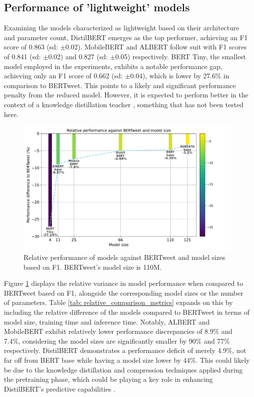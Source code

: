 \subsection{Performance of 'lightweight' models}
Examining the models characterized as lightweight based on their architecture and parameter count, DistilBERT emerges as the top performer, achieving an F1 score of 0.863 (sd: $\pm$0.02). MobileBERT and ALBERT follow suit with F1 scores of 0.841 (sd: $\pm$0.02) and 0.827 (sd: $\pm$0.05) respectively. BERT Tiny, the smallest model employed in the experiments, exhibits a notable performance gap, achieving only an F1 score of 0.662 (sd: $\pm$0.04), which is lower by 27.6\% in comparison to BERTweet. This points to a likely and significant performance penalty from the reduced model. However, it is expected to perform better in the context of a knowledge distillation teacher \cite{turcWellReadStudentsLearn2019}, something that has not been tested here.\\

\begin{figure}[htb]
    \centering
    \includegraphics[width=12cm]{figures/model_size_vs_perf.pdf}
    \vspace*{-3mm}
    \caption{Relative performance of models against BERTweet and model sizes based on F1. BERTweet's model size is 110M.}
    \label{fig: model_size_vs_perf}
\end{figure}

Figure \ref{fig: model_size_vs_perf} displays the relative variance in model performance when compared to BERTweet based on F1, alongside the corresponding model sizes or the number of parameters. Table \ref{tab: relative_comparison_metrics} expands on this by including the relative difference of the models compared to BERTweet in terms of model size, training time and inference time. Notably, ALBERT and MobileBERT exhibit relatively lower performance discrepancies of 8.9\% and 7.4\%, considering the model sizes are significantly smaller by 90\% and 77\% respectively. DistilBERT demonstrates a performance deficit of merely 4.9\%, not far off from BERT base while having a model size lower by 44\%. This could likely be due to the knowledge distillation and compression techniques applied during the pretraining phase, which could be playing a key role in enhancing DistilBERT's predictive capabilities \cite{sanhDistilBERTDistilledVersion2020}.

